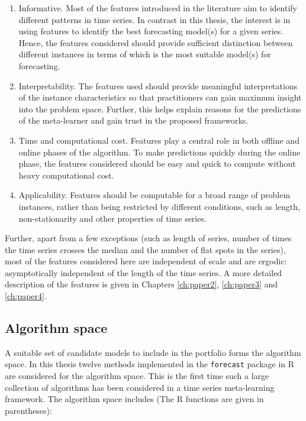 \documentclass{monashthesis}
\begin{document}
\begin{enumerate}
\def\labelenumi{\roman{enumi})}
\item
  Informative. Most of the features introduced in the literature aim to identify different patterns in time series. In contrast in this thesis, the interest is in using features to identify the best forecasting model(s) for a given series. Hence, the features considered should provide sufficient distinction between different instances in terms of which is the most suitable model(s) for forecasting.
\item
  Interpretability. The features used should provide meaningful interpretations of the instance characteristics so that practitioners can gain maximum insight into the problem space. Further, this helps explain reasons for the predictions of the meta-learner and gain trust in the proposed frameworks.
\item
  Time and computational cost. Features play a central role in both offline and online phases of the algorithm. To make predictions quickly during the online phase, the features considered should be easy and quick to compute without heavy computational cost.
\item
  Applicability. Features should be computable for a broad range of problem instances, rather than being restricted by different conditions, such as length, non-stationarity and other properties of time series.
\end{enumerate}

Further, apart from a few exceptions (such as length of series, number of times the time series crosses the median and the number of flat spots in the series), most of the features considered here are independent of scale and are ergodic: asymptotically independent of the length of the time series. A more detailed description of the features is given in Chapters \ref{ch:paper2}, \ref{ch:paper3} and \ref{ch:paper4}.

\hypertarget{algorithm-space}{%
\subsection{Algorithm space}\label{algorithm-space}}

A suitable set of candidate models to include in the portfolio forms the algorithm space. In this thesis twelve methods implemented in the \texttt{forecast} package in R \autocite{forecast} are considered for the algorithm space. This is the first time such a large collection of algorithms has been considered in a time series meta-learning framework. The algorithm space includes (The R functions are given in parentheses):
\end{document}
